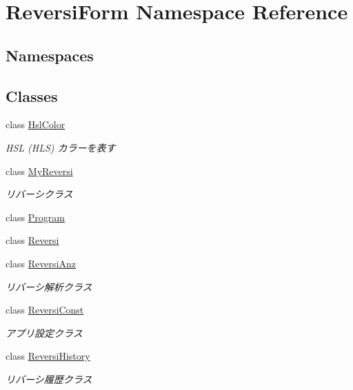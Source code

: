 \hypertarget{namespace_reversi_form}{}\section{Reversi\+Form Namespace Reference}
\label{namespace_reversi_form}
\subsection*{Namespaces}
\begin{DoxyCompactItemize}
\end{DoxyCompactItemize}
\subsection*{Classes}
\begin{DoxyCompactItemize}
\item 
class \hyperlink{class_reversi_form_1_1_hsl_color}{Hsl\+Color}
\begin{DoxyCompactList}\small\item\em H\+SL (H\+LS) カラーを表す \end{DoxyCompactList}\item 
class \hyperlink{class_reversi_form_1_1_my_reversi}{My\+Reversi}
\begin{DoxyCompactList}\small\item\em リバーシクラス \end{DoxyCompactList}\item 
class \hyperlink{class_reversi_form_1_1_program}{Program}
\item 
class \hyperlink{class_reversi_form_1_1_reversi}{Reversi}
\item 
class \hyperlink{class_reversi_form_1_1_reversi_anz}{Reversi\+Anz}
\begin{DoxyCompactList}\small\item\em リバーシ解析クラス \end{DoxyCompactList}\item 
class \hyperlink{class_reversi_form_1_1_reversi_const}{Reversi\+Const}
\begin{DoxyCompactList}\small\item\em アプリ設定クラス \end{DoxyCompactList}\item 
class \hyperlink{class_reversi_form_1_1_reversi_history}{Reversi\+History}
\begin{DoxyCompactList}\small\item\em リバーシ履歴クラス \end{DoxyCompactList}\item 

\end{DoxyCompactItemize}
